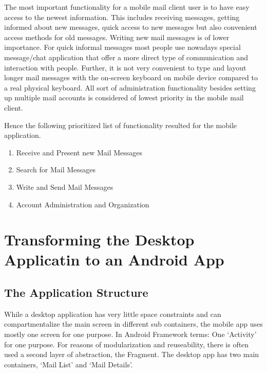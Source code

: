 \documentclass[a4paper,11pt,twoside]{article}
\begin{document}
The most important functionality for a mobile mail client user is to have easy
access to the newest information. This includes receiving messages, getting
informed about new messages, quick access to new messages but also convenient
access methods for old messages. Writing new mail messages is of lower
importance. For quick informal messages most people use nowadays special
message/chat application that offer a more direct type of communication and
interaction with people. Further, it is not very convenient to type and layout
longer mail messages with the on-screen keyboard on mobile device compared to a
real physical keyboard. All sort of administration functionality besides setting
up multiple mail accounts is considered of lowest priority in the mobile mail
client.

Hence the following prioritized list of functionality resulted for the mobile
application.
\begin{enumerate}
  \item Receive and Present new Mail Messages
  \item Search for Mail Messages
  \item Write and Send Mail Messages
  \item Account Administration and Organization
\end{enumerate}



\section{Transforming the Desktop Applicatin to an Android App}
\subsection{The Application Structure}
While a desktop application has very little space constraints and can
compartmentalize the main screen in different sub containers, the mobile app
uses mostly one screen for one purpose. In Android Framework terms: One `Activity'
for one purpose. For reasons of modularization and
reuseability, there is often used a second layer of abstraction, the
Fragment.  The desktop app has two main containers, `Mail List' and `Mail
Details'.
\end{document}
